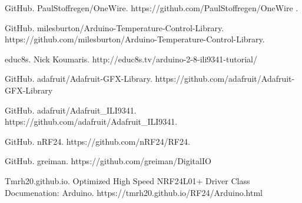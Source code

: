 \begin{thebibliography}{9}
GitHub. PaulStoffregen/OneWire. https://github.com/PaulStoffregen/OneWire .

GitHub. milesburton/Arduino-Temperature-Control-Library. https://github.com/milesburton/Arduino-Temperature-Control-Library.

educ8s. Nick Koumaris.
http://educ8s.tv/arduino-2-8-ili9341-tutorial/

GitHub. adafruit/Adafruit-GFX-Library.  https://github.com/adafruit/Adafruit-GFX-Library

GitHub. adafruit/Adafruit\_ILI9341. https://github.com/adafruit/Adafruit\_ILI9341.

GitHub. nRF24. https://github.com/nRF24/RF24.

GitHub. greiman. https://github.com/greiman/DigitalIO

Tmrh20.github.io. Optimized High Speed NRF24L01+ Driver Class Documenation: Arduino. https://tmrh20.github.io/RF24/Arduino.html


\end{thebibliography}